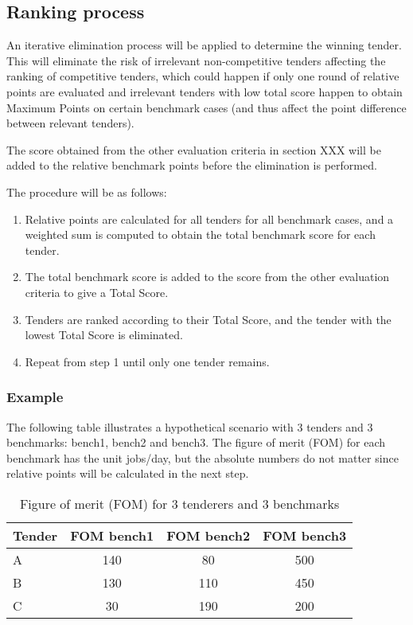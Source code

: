 \documentclass{article}
\begin{document}
\subsection*{Ranking process}

An iterative elimination process will be applied to determine the winning tender. This will eliminate the risk of irrelevant non-competitive tenders affecting the ranking of competitive tenders, which could happen if only one round of relative points are evaluated and irrelevant tenders with low total score happen to obtain Maximum Points on certain benchmark cases (and thus affect the point difference between relevant tenders).

The score obtained from the other evaluation criteria in section XXX will be added to the relative benchmark points before the elimination is performed.

The procedure will be as follows:

\begin{enumerate}
    \item Relative points are calculated for all tenders for all benchmark
    cases, and a weighted sum is computed to obtain the total 
    benchmark score for each tender. 
    \item The total benchmark score is added to the score from the other evaluation criteria to give a Total Score.
    \item Tenders are ranked according to their Total Score, and  the tender with the lowest Total Score is eliminated.
    \item Repeat from step 1 until only one tender remains.
\end{enumerate}

\subsubsection*{Example}

The following table illustrates a hypothetical scenario with 3 tenders and 3 benchmarks: bench1, bench2 and bench3. The figure of merit (FOM) for each benchmark has the unit jobs/day, but the absolute numbers do not matter since relative points will be calculated in the next step.

\begin{table}[h]
\centering
\caption{Figure of merit (FOM) for 3 tenderers and 3 benchmarks}
\begin{tabular}{l|c|c|c}
\hline\hline
    Tender & FOM bench1 & FOM bench2 & FOM bench3 \\ \hline
    A & 140 & 80 & 500 \\ \hline
    B & 130 & 110 & 450 \\ \hline
    C & 30 & 190 & 200 \\ \hline\hline
    \end{tabular}
    \label{tab:ex_fom}
\end{table}
\end{document}
